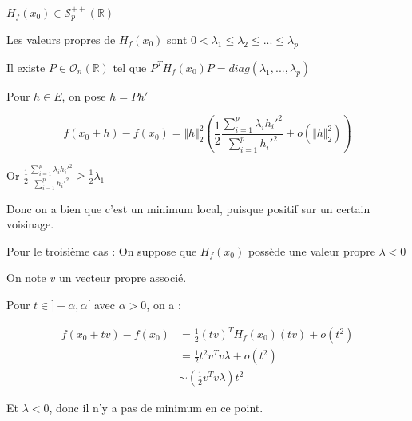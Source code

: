 \documentclass[a4paper,12pt]{book}
\newcommand{\Pre}[1]{\begin{tcolorbox}[sharp corners, colback=white,colframe=green!60!green!30!black!75, title=Preuve]#1\end{tcolorbox}}
\def\R{\mathbb{R}}
\begin{document}
\Pre{$H_f(x_0)\in\mathcal{S}_p^{++}(\R)$
\par Les valeurs propres de $H_f(x_0)$ sont $0<\lambda_1\leq \lambda_2\leq...\leq \lambda_p$
\par Il existe $P\in\mathcal{O}_n(\R)$ tel que $P^TH_f(x_0)P = diag(\lambda_1,...,\lambda_p)$
\par Pour $h\in E$, on pose $h = Ph'$
\par $$f(x_0+h)-f(x_0) = \Vert h\Vert_2^2\left(\frac{1}{2}\frac{\sum\limits_{i=1}^p\lambda_ih_i'^2}{\sum\limits_{i=1}^ph_i'^2} + o(\Vert h\Vert_2^2)\right)$$
\par Or $\frac{1}{2}\frac{\sum\limits_{i=1}^p\lambda_ih_i'^2}{\sum\limits_{i=1}^ph_i'^2}\geq \frac{1}{2}\lambda_1$
\par Donc on a bien que c'est un minimum local, puisque positif sur un certain voisinage.
\par Pour le troisième cas : On suppose que $H_f(x_0)$ possède une valeur propre $\lambda<0$
\par On note $v$ un vecteur propre associé.
\par Pour $t\in]-\alpha, \alpha[$ avec $\alpha>0$, on a :
\par \begin{align*} f(x_0+tv)-f(x_0)&=\frac{1}{2}(tv)^TH_f(x_0)(tv) + o(t^2)\\
&= \frac{1}{2}t^2v^Tv\lambda + o(t^2)\\
&\sim \left(\frac{1}{2}v^Tv\lambda\right)t^2
\end{align*}
\par Et $\lambda<0$, donc il n'y a pas de minimum en ce point.}
\end{document}

